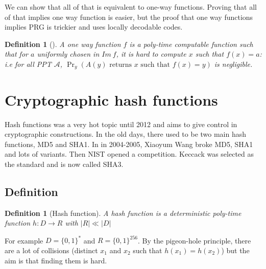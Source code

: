 \documentclass{article}
\newtheorem{defi}[thm]{Definition}
\newcommand{\Def}[3]{\begin{defi}[#1]\label{#2}#3\end{defi}}
\newcommand{\A}{\mathcal{A}}
\newcommand{\bit}{\{0,1\}}
\begin{document}
\begin{center}
\end{center}

We can show that all of that is equivalent to one-way functions. Proving that all of that implies one way function is easier, but the proof that one way functions implies PRG is trickier and uses locally decodable codes.

\Def{}{def:oneway}{A one way function $f$ is a poly-time computable function such that for $a$ uniformly chosen in $Im\ f$, it is hard to compute $x$ such that $f(x)=a$: i.e for all PPT $\A$, $\Pr_y(A(y)\text{ returns $x$ such that } f(x)=y)$ is negligible.}

\section{Cryptographic hash functions}
Hash functions was a very hot topic until 2012 and aims to give control in cryptographic constructions. In the old days, there used to be two main hash functions, MD5 and SHA1. In in 2004-2005, Xiaoyum Wang broke MD5, SHA1 and lots of variants. Then NIST opened a competition. Keccack was selected as the standard and is now called SHA3.

\subsection{Definition}
\Def{Hash function}{def:hash}{A hash function is a deterministic poly-time function $h:D\rightarrow R$ with $|R|\ll|D|$}

For example $D=\bit^*$ and $R=\bit^{256}$. By the pigeon-hole principle, there are a lot of collisions (distinct $x_1$ and $x_2$ such that $h(x_1)=h(x_2)$) but the aim is that finding them is hard.
\end{document}
